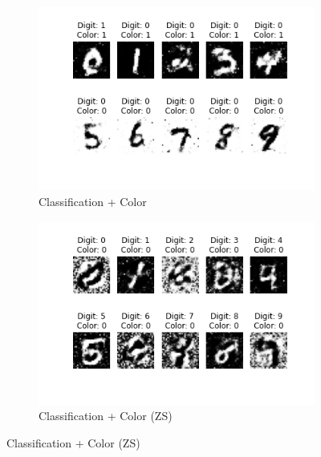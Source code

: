 \documentclass[11pt, letterpaper, oneside]{article}
\begin{document}
\begin{figure}
    \begin{subfigure}{.5\textwidth}
      \centering
      \includegraphics[width=1\linewidth]{dig_inv.png}  
      \caption{Classification + Color}
      \label{fig:sub-first}
    \end{subfigure}
    \begin{subfigure}{.5\textwidth}
      \centering
      \includegraphics[width=1\linewidth]{digit_no_color.png}  
      \caption{Classification + Color (ZS)}
      \label{fig:sub-second}
    \end{subfigure}



\end{figure}
\end{document}
